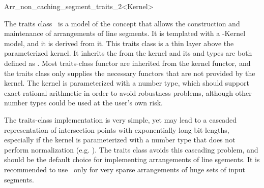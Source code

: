 
\ccRefPageBegin

\begin{ccRefClass}{Arr_non_caching_segment_traits_2<Kernel>}
    
\ccDefinition 

The traits class \ccRefName\ is a model of the 
concept that allows the construction and maintenance of arrangements of
line segments. It is templated with a \cgal-Kernel model, and it is derived
from it. This traits class is a thin layer above the parameterized kernel.
It inherits the  from the kernel and its
 and  types are both defined as
. Most traits-class functor are inherited from the
kernel functor, and the traits class only supplies the necessary functors
that are not provided by the kernel. The kernel is parameterized with a
number type, which should support exact rational arithmetic in order to
avoid robustness problems, although other number types could be used at the
user's own risk.

The traits-class implementation is very simple, yet may lead to
a cascaded representation of intersection points with exponentially long
bit-lengths, especially if the kernel is parameterized with a number type
that does not perform normalization (e.g. ).
The  traits class avoids this cascading
problem, and should be the default choice for implementing arrangements of
line sgements. It is recommended to use \ccRefName\ only for very sparse
arrangements of huge sets of input segments.
    
 
\ccIsModel
     \\
     \\

\ccInheritsFrom

\ccSeeAlso

\end{ccRefClass}
\ccRefPageEnd

